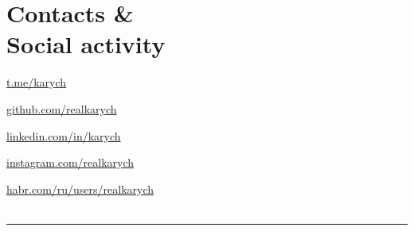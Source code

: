 \documentclass[a4paper,10pt]{article}
\newcommand{\MyVerticalRule}{%
	\textcolor{ColorOne}{\rule{1pt}{\textheight}}
}
\newcommand{\myhref}[2]{%
\href{#1}{\textcolor{ColorTwo}{#2}}
}
\begin{document}
\begin{adjustbox}{valign=t}
\begin{minipage}{0.3\textwidth}
\begin{description}
\end{description}

\section*{Contacts \& \\ Social activity}
\begin{description}
    \raggedright
        \item [\normalfont \textcolor{ColorOne}{\faTelegram}] \myhref{https://t.me/karych}{t.me/karych} \\
        \item [\normalfont \textcolor{ColorOne}{\faGithub}] \myhref{https://github.com/realkarych}{github.com/realkarych} \\
        \item [\normalfont \textcolor{ColorOne}{\faLinkedin}] \myhref{https://www.linkedin.com/in/karych}{linkedin.com/in/karych} \\
        \item [\normalfont \textcolor{ColorOne}{\faInstagram}] \myhref{https://instagram.com/realkarych}{instagram.com/realkarych} \\
        \item [\normalfont \textcolor{ColorOne}{\faLink}] \myhref{https://habr.com/ru/users/realkarych/}{habr.com/ru/users/realkarych} \\
\\
 
\end{description}

\vfill
\end{minipage}
\end{adjustbox}
%
%
%
\hfill
\begin{adjustbox}{valign=t}
\begin{minipage}{0.05\textwidth}
\MyVerticalRule
\end{minipage}
\end{adjustbox}
\hfill
\end{document}
